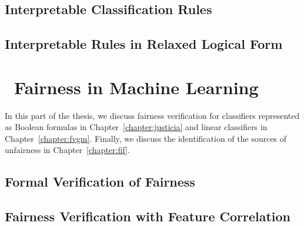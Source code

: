 	\chapter{Interpretable Classification Rules}
	
	
	
	
	
	
	
	
	
	
	\chapter{Interpretable Rules in Relaxed Logical Form}
	
	
	
	
	
	
	

	\part{~Fairness in Machine Learning}
	
	In this part of the thesis, we discuss fairness verification for classifiers represented as Boolean formulas in Chapter~\ref{chapter:justicia} and linear classifiers in Chapter~\ref{chapter:fvgm}. Finally, we discuss the identification of the sources of unfairness in Chapter~\ref{chapter:fif}.

	\chapter{Formal Verification of Fairness}
	
	
	
	
	

	\chapter{Fairness Verification with Feature Correlation}
	
	
	
	
	
	
					
